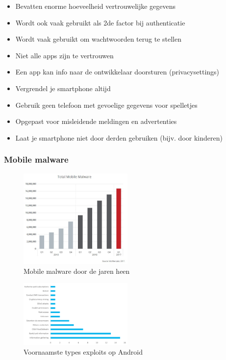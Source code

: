 \documentclass{article}
\begin{document}
\begin{itemize}
    \item Bevatten enorme hoeveelheid vertrouwelijke gegevens
    \item Wordt ook vaak gebruikt als 2de factor bij authenticatie
    \item Wordt vaak gebruikt om wachtwoorden terug te stellen
    \item Niet alle apps zijn te vertrouwen
    \item Een app kan info naar de ontwikkelaar doorsturen (privacysettings)
    \item Vergrendel je smartphone altijd
    \item Gebruik geen telefoon met gevoelige gegevens voor spelletjes
    \item Opgepast voor misleidende meldingen en advertenties
    \item Laat je smartphone niet door derden gebruiken (bijv. door kinderen)
\end{itemize}

\subsubsection{Mobile malware}

\begin{figure}[H]
    \centering
    \includegraphics[width=0.5\textwidth]{mobile-malware.jpg}
    \caption{Mobile malware door de jaren heen}
\end{figure}

\begin{figure}[H]
    \centering
    \includegraphics[width=0.5\textwidth]{mobile-malware-types.png}
    \caption{Voornaamste types exploits op Android}
\end{figure}
\end{document}
